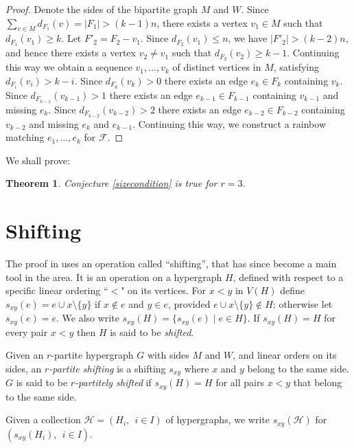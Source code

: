 \documentclass{amsart}
\newtheorem{theorem}{Theorem}[section]
\theoremstyle{remark}
\newcommand{\cf}{\mathcal F}
\newcommand{\ch}{\mathcal H}
\begin{document}
\begin{proof}

Denote the sides of the bipartite graph $M$ and $W$. Since $\sum_{v
\in M} d_{F_1}(v)=|F_1|>(k-1)n$, there exists
 a vertex $v_1 \in M$ such that $d_{F_1}(v_1)\ge k$. Let
 $F'_2=F_2-v_1$. Since $d_{F_2}(v_1)\le n$, we have $|F'_2| >
 (k-2)n$, and hence there exists a vertex $v_2 \neq v_1$ such that $d_{F_2}(v_2)\ge
 k-1$. Continuing this way we obtain a sequence $v_1, \ldots, v_k$
 of distinct vertices in $M$, satisfying $d_{F_i}(v_i)> k-i$.
 Since $d_{F_k}(v_k)>0$ there exists an edge $e_k \in F_k$ containing
 $v_k$.
Since $d_{F_{k-1}}(v_{k-1})>1$ there exists an edge $e_{k-1} \in
F_{k-1}$ containing
 $v_{k-1}$ and missing $e_k$.
 Since $d_{F_{k-2}}(v_{k-2})>2$ there exists an edge $e_{k-2} \in
F_{k-2}$ containing
 $v_{k-2}$ and missing $e_k$ and $e_{k-1}$. Continuing this way, we
 construct a rainbow matching $e_1, \ldots,e_k$ for $\cf$.
 \end{proof}

We shall prove:

\begin{theorem}\label{generalr3}
Conjecture \ref{sizecondition} is true for $r=3$.
\end{theorem}




\section{Shifting} \label{shifting}
 The proof in \cite{ekr} uses an operation called ``shifting'', that has since become  a main tool in the area. It is an operation on a
hypergraph $H$, defined with respect to a specific linear ordering
``$<$" on its vertices. For $x<y$ in $V(H)$ define  $s_{xy}(e)=e
\cup {x} \setminus \{y\}$ if $x \not \in e$ and $y \in e$, provided
 $e \cup {x} \setminus \{y\} \not \in H$; otherwise let $s_{xy}(e)=e$.
  We also write $s_{xy}(H)=\{s_{xy}(e) \mid e \in H\}$. If
$s_{xy}(H)=H$ for every pair $x<y$ then $H$ is said to be {\em
shifted}.

Given an $r$-partite hypergraph $G$ with sides $M$ and $W$, and
linear orders on its sides, an {\em $r$-partite shifting} is a
shifting $s_{xy}$ where $x$ and $y$ belong to the same side. $G$ is
said to be {\em $r$-partitely shifted} if $s_{xy}(H)=H$ for all
pairs $x<y$ that belong to the same side.

Given a collection $\ch=(H_i,~~i \in I)$ of hypergraphs, we write
$s_{xy}(\ch)$ for $(s_{xy}(H_i),~~i \in I)$.
\end{document}
